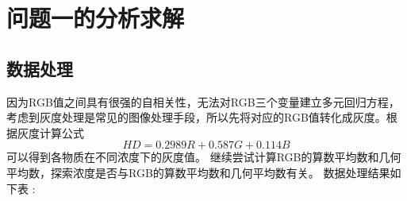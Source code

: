 \section{问题一的分析求解}
\subsection{数据处理}
        因为RGB值之间具有很强的自相关性，无法对RGB三个变量建立多元回归方程，考虑到灰度处理是常见的图像处理手段，所以先将对应的RGB值转化成灰度。根据灰度计算公式
        $$HD = 0.2989R + 0.587G + 0.114B$$
        可以得到各物质在不同浓度下的灰度值。
        继续尝试计算RGB的算数平均数和几何平均数，探索浓度是否与RGB的算数平均数和几何平均数有关。
        数据处理结果如下表 :
